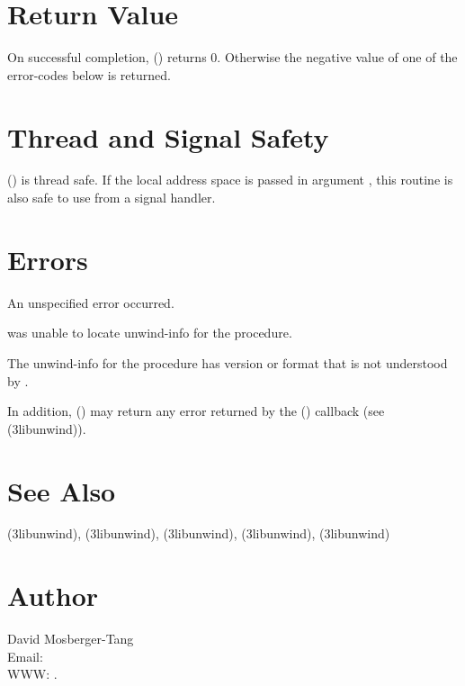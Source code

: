 \documentclass{article}
\begin{document}
\section{Return Value}

On successful completion, ()
returns 0.  Otherwise the negative value of one of the error-codes
below is returned.

\section{Thread and Signal Safety}

() is thread safe.  If the local
address space is passed in argument , this routine is also
safe to use from a signal handler.

\section{Errors}

\begin{Description}
\item[\Const{UNW\_EUNSPEC}] An unspecified error occurred.
\item[\Const{UNW\_ENOINFO}]  was unable to locate
  unwind-info for the procedure.
\item[\Const{UNW\_EBADVERSION}] The unwind-info for the procedure has
  version or format that is not understood by .
\end{Description}
In addition, () may return any
error returned by the () callback (see
(3libunwind)).

\section{See Also}

(3libunwind),
(3libunwind),
(3libunwind),
(3libunwind),
(3libunwind)

\section{Author}

\noindent
David Mosberger-Tang\\
Email: \\
WWW: .
\LatexManEnd
\end{document}
